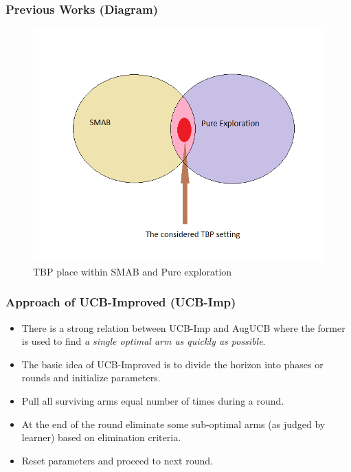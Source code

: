 \begin{frame}
\frametitle{Previous Works (Diagram)}
\centering
\begin{figure}
\includegraphics[scale=0.3]{img/Settings2.png}
\caption{TBP place within SMAB and Pure exploration}
\end{figure}



\end{frame}

\begin{frame}
\frametitle{Approach of UCB-Improved (UCB-Imp)}
\begin{itemize}
\item<1-> There is a strong relation between UCB-Imp \cite{auer2010ucb} and AugUCB where the former is used to find \emph{a single optimal arm as quickly as possible}.
\item<2-> The basic idea of UCB-Improved is to divide the horizon into phases or rounds and initialize parameters.
\item<3-> Pull all surviving arms equal number of times during a round.
\item<4-> At the end of the round eliminate some sub-optimal arms (as judged by learner) based on elimination criteria.
\item<5-> Reset parameters and proceed to next round.
\end{itemize}
\end{frame}

